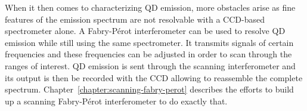 When it then comes to characterizing \ac{QD} emission, more obstacles arise as fine features of the emission spectrum are not resolvable with a CCD-based spectrometer alone.
A Fabry-Pérot interferometer can be used to resolve \ac{QD} emission while still using the same spectrometer.
It transmits signals of certain frequencies and these frequencies can be adjusted in order to scan through the ranges of interest.
\ac{QD} emission is sent through the scanning interferometer and its output is then be recorded with the CCD allowing to reassemble the complete spectrum.
Chapter~\ref{chapter:scanning-fabry-perot} describes the efforts to build up a scanning Fabry-Pérot interferometer to do exactly that.


